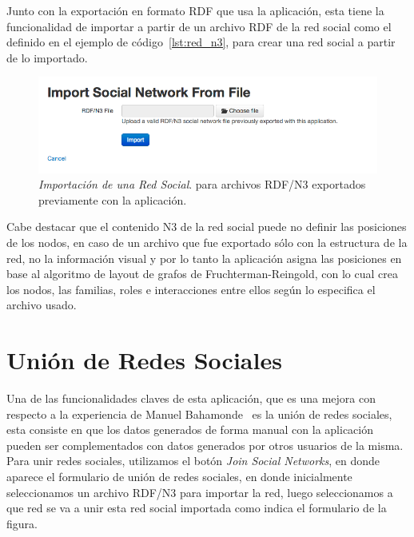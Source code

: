 Junto con la exportación en formato RDF que usa la aplicación, esta tiene la funcionalidad de importar a partir de un archivo RDF de la red social como el definido en el ejemplo de código~\ref{lst:red_n3}, para crear una red social a partir de lo importado.

\begin{figure}[H]
  \centering
  \includegraphics[width=1.0\textwidth]{images/import_sn.png}
  \caption[Importación de una Red Social]{\emph{Importación de una Red Social}. para archivos RDF/N3 exportados previamente con la aplicación.}
  \label{import_sn}
\end{figure}

Cabe destacar que el contenido N3 de la red social puede no definir las posiciones de los nodos, en caso de un archivo que fue exportado sólo con la estructura de la red, no la información visual y por lo tanto la aplicación asigna las posiciones en base al algoritmo de layout de grafos de Fruchterman-Reingold, con lo cual crea los nodos, las familias, roles e interacciones entre ellos según lo especifica el archivo usado.


\section{Unión de Redes Sociales} %
\label{sec:union_de_redes_sociales}

Una de las funcionalidades claves de esta aplicación, que es una mejora con respecto a la experiencia de Manuel Bahamonde~\cite{memoriamanuel} es la unión de redes sociales, esta consiste en que los datos generados de forma manual con la aplicación pueden ser complementados con datos generados por otros usuarios de la misma.\\

Para unir redes sociales, utilizamos el botón \emph{Join Social Networks}, en donde aparece el formulario de unión de redes sociales, en donde inicialmente seleccionamos un archivo RDF/N3 para importar la red, luego seleccionamos a que red se va a unir esta red social importada como indica el formulario de la figura.\\

